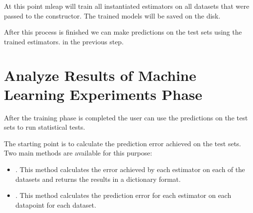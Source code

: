 \documentclass[letterpaper,10pt,english]{sphinxmanual}
\begin{document}
At this point mleap will train all instantiated estimators on all datasets that were passed to the constructor. The trained models will be saved on the disk.

After this process is finished we can make predictions on the test sets using the trained estimators. in the previous step.


\begin{sphinxVerbatim}[commandchars=\\\{\}]
 
\end{sphinxVerbatim}


\section{Analyze Results of Machine Learning Experiments Phase}
\label{\detokenize{tutorial:analyze-results-of-machine-learning-experiments-phase}}
After the training phase is completed the user can use the predictions on the test sets to run statistical tests.

The starting point is to calculate the prediction error achieved on the test sets. Two main methods are available for this purpose:
\begin{itemize}
\item {} 
. This method calculates the error achieved by each estimator on each of the datasets and returns the results in a dictionary format.

\item {} 
. This method calculates the prediction error for each estimator on each datapoint for each dataset.

\end{itemize}
\end{document}
